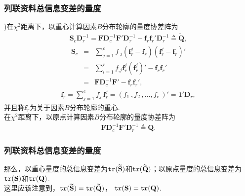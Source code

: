 \begin{frame}\frametitle{\color{blue}列联资料总信息变差的量度}

\begin{footnotesize}
\quad{})\quad 在$\chi^{2}$距离下，以重心计算因素$B$分布轮廓的量度协差阵为
\begin{eqnarray}
 \mathbf{S}_{c}\mathbf{D}_{r}^{-1}=\mathbf{F}\mathbf{D}_{c}^{-1}\mathbf{F}'\mathbf{D}_{r}^{-1}
         -\mathbf{f}_{r}\mathbf{f}_{r}'\mathbf{D}_{r}^{-1}\triangleq\mathbf{\widetilde{Q}},
\end{eqnarray}
\begin{eqnarray}
        \mathbf{S}_{c}&=&\sum^{c}_{j=1}f_{.j}(\mathbf{f}^{j}_{r}-\mathbf{f}_{r})
                          (\mathbf{f}^{j}_{r}-\mathbf{f}_{r})'\nonumber \\
                      &=&\sum^{r}_{i=1}f_{.j}\mathbf{f}^{j}_{r}(\mathbf{f}^{j}_{r})'
                           -\mathbf{f}_{r}\mathbf{f}_{r}' \nonumber\\
                      &=&\mathbf{F}\mathbf{D}_{c}^{-1}\mathbf{F}'-
                          \mathbf{f}_{r}\mathbf{f}_{r}',
\end{eqnarray}
\begin{eqnarray}
\mathbf{f}_{r}=\sum^{c}_{j=1}f_{j.}\mathbf{f}_{r}^{j}=(f_{1.},f_{2.},...,f_{c.})'=\mathbf{1}'\mathbf{D}_{r},
\end{eqnarray}
并且称$\mathbf{f}_{r}$为关于因素$B$分布轮廓的重心.\\
\color{blue}在$\chi^{2}$距离下，以原点计算因素$B$分布轮廓的量度协差阵为
\begin{eqnarray}
 \mathbf{F}\mathbf{D}_{c}^{-1}\mathbf{F}'\mathbf{D}_{r}^{-1}\triangleq\mathbf{Q}.
\end{eqnarray}
\end{footnotesize}
\end{frame}
\begin{frame}\frametitle{\color{blue}列联资料总信息变差的量度}

\quad\quad 那么，以重心量度的总信息变差为${\tt{tr}}(\mathbf{\widetilde{S}})$和${\tt{tr}}(\mathbf{\widetilde{Q}})$；以原点量度的总信息变差为${\tt{tr}}(\mathbf{S})$和${\tt{tr}}(\mathbf{Q})$.\\
\quad\quad \color{blue} 这里应该注意到，${\tt{tr}}(\mathbf{\widetilde{S}})={\tt{tr}}(\mathbf{\widetilde{Q}})$，
${\tt{tr}}(\mathbf{S})={\tt{tr}}(\mathbf{Q})$.
\end{frame}

